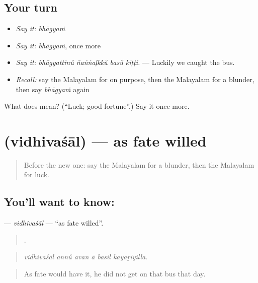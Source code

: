 \subsection*{Your turn}
\begin{itemize}
\raggedright
  \item \emph{Say it:} \emph{bhāgyaṁ}
  \item \emph{Say it:} \emph{bhāgyaṁ}, once more
  \item \emph{Say it:} \emph{bhāgyattinŭ ñaṅṅaḷkkŭ basŭ kiṭṭi.} — Luckily we caught the bus.
  \item \emph{Recall:} say the Malayalam for on purpose, then the Malayalam for a blunder, then say \emph{bhāgyaṁ} again
\end{itemize}

\begin{tcolorbox}[breakable,colback=teal!4,colframe=teal!35!black,title={Before you move on}]
What does  mean? (\textquotedblleft{}Luck; good fortune\textquotedblright{}.) Say it once more.
\end{tcolorbox}
\section[\texorpdfstring{\ml{വിധിവശാൽ} (vidhivaśāl)}{വിധിവശാൽ (vidhivaśāl)}]{ (vidhivaśāl) — as fate willed}

\label{lesson:ML-C360-vidhivasal}



\begin{quote}
Before the new one: say the Malayalam for a blunder, then the Malayalam for luck.
\end{quote}

\subsection*{You'll want to know: }
\textbf{} — \emph{vidhivaśāl} — \textquotedblleft{}as fate willed\textquotedblright{}.

\begin{quote}
     .
\end{quote}

\begin{quote}
\emph{vidhivaśāl annŭ avan ā basil kayaṟiyilla.}
\end{quote}

\begin{quote}
As fate would have it, he did not get on that bus that day.
\end{quote}

